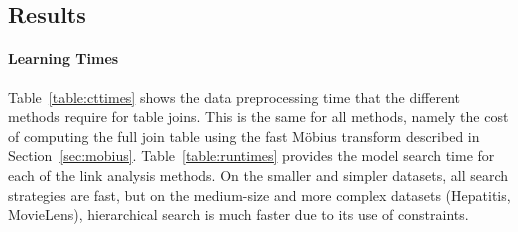 \documentclass[runningheads,a4paper]{llncs}
\begin{document}
\subsection{Results} 

\paragraph{Learning Times} Table~\ref{table:cttimes} shows the data preprocessing time that the different methods require for table joins. This is the same for all methods, namely the cost of computing the full join table using the fast M\"obius transform described in Section~\ref{sec:mobius}. 
Table~\ref{table:runtimes}
 provides the model search time for each of the link analysis methods. 
On the smaller and simpler datasets, all search strategies are fast, 
but on the medium-size and more complex datasets (Hepatitis, MovieLens), hierarchical search is much faster due to its use of constraints.
\end{document}
